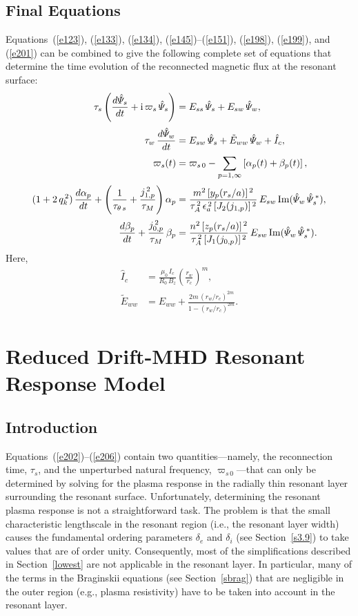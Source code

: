 \documentclass[notitlepage,12pt]{article}
\begin{document}
\subsection{Final Equations}
Equations~(\ref{e123}), (\ref{e133}), (\ref{e134}),  (\ref{e145})--(\ref{e151}), (\ref{e198}), (\ref{e199}), and (\ref{e201})
can be combined to give the following complete set of equations that determine the time evolution of the reconnected 
magnetic flux at the resonant surface:
\begin{align}\label{e202}
\tau_s\left(\frac{d\hat{\mit\Psi}_s}{dt} + {\rm i}\,\varpi_s\,\hat{\mit\Psi}_s\right) &= E_{ss}\,\hat{\mit\Psi}_s + E_{sw}\,\hat{\mit\Psi}_w,\\[0.5ex]
\tau_w\,\frac{d\hat{\mit\Psi}_w}{dt} &= E_{sw}\,\hat{\mit\Psi}_s +\tilde{E}_{ww}\,\hat{\mit\Psi}_w
+\hat{I}_c,\\[0.5ex]
\varpi_s(t)& = \varpi_{s\,0} - \sum_{p=1,\infty}\left[\alpha_p(t)+\beta_p(t)\right],\\[0.5ex]
(1+2\,q_k^{\,2})\,\frac{d\alpha_p}{dt} + \left(\frac{1}{\tau_{\theta\,s}}+\frac{j_{1,p}^{\,2}}{\tau_{M}}\right)\alpha_p
&= \frac{m^{2}\,[y_p(r_s/a)]^{\,2}}{\tau_A^{\,2}\,\epsilon_a^{\,2}\,[J_2(j_{1,p})]^{\,2}}
\,E_{sw}\,{\rm Im}(\hat{\mit\Psi}_w\,\hat{\mit\Psi}_s^{\,\ast}),\\[0.5ex]
\frac{d\beta_p}{dt} + \frac{j_{0,p}^{\,2}}{\tau_{M}}\,\beta_p
&= \frac{n^{2}\,[z_p(r_s/a)]^{\,2}}{\tau_A^{\,2}\,[J_1(j_{0,p})]^{\,2}}\,
E_{sw}\,{\rm Im}(\hat{\mit\Psi}_w\,\hat{\mit\Psi}_s^{\,\ast}).\label{e206}
\end{align}
Here, 
\begin{align}
\hat{I}_c &= \frac{\mu_0\,I_c}{R_0\,B_z}\left(\frac{r_w}{r_c}\right)^m,\\[0.5ex]
\tilde{E}_{ww} &= E_{ww} + \frac{2m\,(r_w/r_c)^{2m}}{1-(r_w/r_c)^{2m}}.\label{e208}
\end{align}

\section{Reduced Drift-MHD Resonant  Response Model}
\subsection{Introduction}
Equations~(\ref{e202})--(\ref{e206}) contain two quantities---namely, the reconnection time, $\tau_s$, and the unperturbed
natural frequency, $\varpi_{s\,0}$---that can only be determined by solving for the plasma response in the radially thin resonant layer surrounding the resonant surface. Unfortunately, determining the resonant plasma response is not a straightforward task. The
problem is that the small characteristic lengthscale in the resonant region (i.e., the resonant layer width) causes the fundamental ordering parameters
$\delta_e$ and $\delta_i$ (see Section~\ref{s3.9}) to take values that are of order unity. Consequently, most of the simplifications described in
Section~\ref{lowest} are not applicable in the resonant layer. In particular, many of the terms in the Braginskii equations (see Section~\ref{sbrag}) that are negligible in the outer region (e.g., plasma resistivity) have to be taken into account in the resonant layer. 
\end{document}
